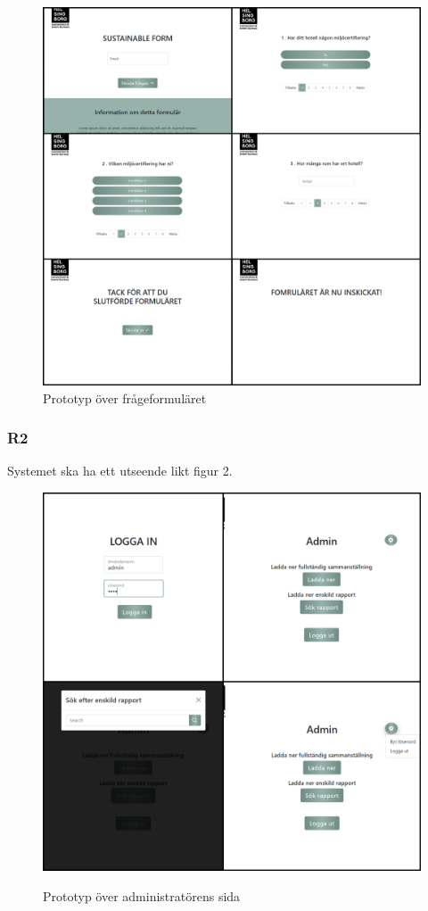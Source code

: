 \documentclass{article}
\begin{document}
    \begin{figure}[h!]
    \caption{Prototyp över frågeformuläret}
    \includegraphics[width=140mm]{Proto-Coll-Q (1).jpg}
    \end{figure}
    \newpage
    \subsubsection*{R2}
    Systemet ska ha ett utseende likt figur 2.
    \begin{figure}[h!]
        \centering
        \caption{Prototyp över administratörens sida}
        \includegraphics[width=140mm]{Proto-Coll-A.jpg}
        \label{fig:my_label}
    \end{figure}
\end{document}
